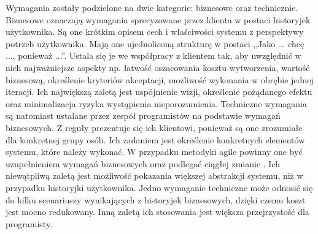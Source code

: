Wymagania zostały podzielone na dwie kategorie: biznesowe oraz technicznie. Biznesowe oznaczają wymagania sprecyzowane przez klienta w postaci historyjek użytkownika. Są one krótkim opisem cech i właściwości systemu z perspektywy potrzeb użytkownika. Mają one ujednoliconą strukturę w postaci ,,Jako ... chcę ..., ponieważ ...''.  Ustala się je we współpracy z klientem tak, aby uwzględnić w nich najważniejsze aspekty np. łatwość oszacowania kosztu wytworzenia, wartość biznesową, określenie kryteriów akceptacji, możliwość wykonania w obrębie jednej iteracji. Ich największą zaletą jest uspójnienie wizji, określenie pożądanego efektu oraz minimalizacja ryzyka wystąpienia nieporozumienia. Techniczne wymagania są natomiast ustalane przez zespół programistów na podstawie wymagań biznesowych. Z reguły prezentuje się ich klientowi, ponieważ są one zrozumiałe dla konkretnej grupy osób. Ich zadaniem jest określenie konkretnych elementów systemu, które należy wykonać. W przypadku metodyki agile powinny one być uzupełnieniem wymagań biznesowych oraz podlegać ciągłej zmianie \cite{AGI01}. Ich niewątpliwą zaletą jest możliwość pokazania większej abstrakcji systemu, niż w przypadku historyjki użytkownika. Jedno wymaganie techniczne może odnosić się do kilku scenariuszy wynikających z historyjek biznesowych, dzięki czemu koszt jest mocno redukowany. Inną zaletą ich stosowania jest większa przejrzystość dla programisty. 

\bigskip

